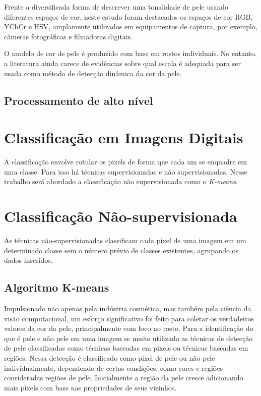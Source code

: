 Frente a diversificada forma de descrever uma tonalidade de pele usando diferentes espaços de cor, neste estudo foram destacados os espaços de cor RGB, YCbCr e HSV, amplamente utilizados em equipamentos de captura, por exemplo, câmeras fotográficas e filmadoras digitais. 

O modelo de cor de pele é produzido com base em rostos
individuais. No entanto, a literatura ainda carece de evidências sobre
qual escala é adequada para ser usada como método de detecção
dinâmica da cor da pele.

\subsection{Processamento de alto nível}

\section{Classificação em Imagens Digitais}
A classificação envolve rotular os pixels de forma que cada um se enquadre em uma classe. Para isso há técnicas supervisionadas e não supervisionadas. Nesse trabalho será abordado a classificação não supervisionada como o \textit{K-means}.

\section{Classificação Não-supervisionada}
As técnicas não-supervisionadas classificam cada pixel de uma imagem em um determinado classe sem o número prévio de classes existentes, agrupando os dados inseridos.

\subsection{Algoritmo K-means} %
Impulsionado não apenas pela indústria cosmética, mas também pela ciência da visão computacional, um esforço significativo foi feito para coletar os verdadeiros valores da cor da pele, principalmente com foco no rosto. Para a identificação do que é pele e não pele em uma imagem se muito utilizado as técnicas de detecção de pele classificadas como técnicas baseadas em pixels ou técnicas baseadas em regiões. Nessa detecção é classificado como pixel de pele ou não pele individualmente, dependendo de certas condições, como cores e regiões consideradas regiões de pele. Inicialmente a região da pele cresce adicionando mais pixels com base nas propriedades de seus vizinhos.

